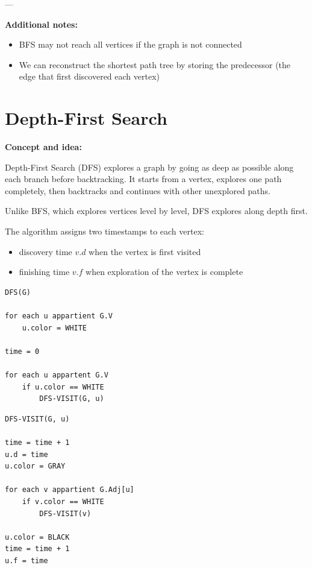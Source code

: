 \documentclass[11pt,a4paper,openany]{book}
\begin{document}
---

\textbf{Additional notes:}
\begin{itemize}
    \item BFS may not reach all vertices if the graph is not connected
    \item We can reconstruct the shortest path tree by storing the predecessor (the edge that first discovered each vertex)
\end{itemize}







\vspace{2cm}





\section{Depth-First Search}

\textbf{Concept and idea:}

Depth-First Search (DFS) explores a graph by going as deep as possible along each branch before backtracking.  
It starts from a vertex, explores one path completely, then backtracks and continues with other unexplored paths.

Unlike BFS, which explores vertices level by level, DFS explores along depth first.

The algorithm assigns two timestamps to each vertex:
\begin{itemize}
    \item discovery time $v.d$ when the vertex is first visited
    \item finishing time $v.f$ when exploration of the vertex is complete
\end{itemize}

\begin{lstlisting}
DFS(G)

for each u appartient G.V
    u.color = WHITE

time = 0

for each u appartent G.V
    if u.color == WHITE
        DFS-VISIT(G, u)
\end{lstlisting}

\begin{lstlisting}
DFS-VISIT(G, u)

time = time + 1
u.d = time
u.color = GRAY

for each v appartient G.Adj[u]
    if v.color == WHITE
        DFS-VISIT(v)

u.color = BLACK
time = time + 1
u.f = time
\end{lstlisting}
\end{document}

